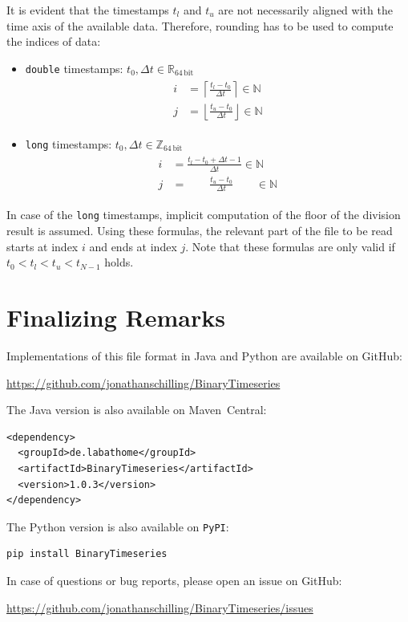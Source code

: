 \documentclass[a4paper,10pt]{article}
\begin{document}
It is evident that the timestamps $t_l$ and $t_u$ are not necessarily aligned with the time axis of the available data.
Therefore, rounding has to be used to compute the indices of data:
\begin{itemize}
  \item \texttt{double} timestamps: $t_0, \Delta t \in \mathbb{R}_\mathrm{64\,bit}$
  \begin{gather}
   \begin{align}
    i & = \left\lceil  \frac{t_l - t_0}{\Delta t} \right\rceil  \in \mathbb{N} \\
    j & = \left\lfloor \frac{t_u - t_0}{\Delta t} \right\rfloor \in \mathbb{N}
   \end{align}
  \end{gather}
  \item \texttt{long} timestamps: $t_0, \Delta t \in \mathbb{Z}_\mathrm{64\,bit}$
  \begin{gather}
   \begin{align}
    i & = \frac{t_l - t_0 + \Delta t - 1}{\Delta t} \in \mathbb{N} \\
    j & = \qquad \frac{t_u - t_0}{\Delta t} \qquad  \in \mathbb{N}
   \end{align}
  \end{gather}
\end{itemize}
In case of the \texttt{long} timestamps, implicit computation of the floor of the division result is assumed.
Using these formulas, the relevant part of the file to be read starts at index $i$ and ends at index $j$.
Note that these formulas are only valid if $t_0 < t_l < t_u < t_{N-1}$ holds.








\section{Finalizing Remarks}
Implementations of this file format in Java and Python are available on GitHub:
\begin{center}
\href{https://github.com/jonathanschilling/BinaryTimeseries}{https://github.com/jonathanschilling/BinaryTimeseries}
\end{center}
The Java version is also available on Maven~Central:
\begin{verbatim}
<dependency>
  <groupId>de.labathome</groupId>
  <artifactId>BinaryTimeseries</artifactId>
  <version>1.0.3</version>
</dependency>
\end{verbatim}
The Python version is also available on \texttt{PyPI}:
\begin{verbatim}
pip install BinaryTimeseries
\end{verbatim}
In case of questions or bug reports, please open an issue on GitHub:
\begin{center}
\href{https://github.com/jonathanschilling/BinaryTimeseries/issues}{https://github.com/jonathanschilling/BinaryTimeseries/issues}
\end{center}
\end{document}

